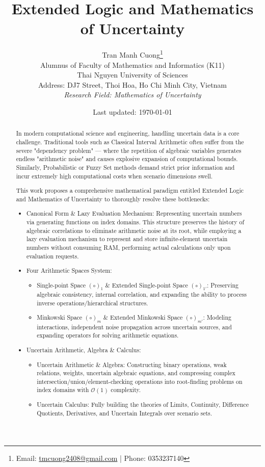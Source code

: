 \documentclass[a4paper,12pt,twoside]{memoir}
\title{Extended Logic and Mathematics of Uncertainty}
\author{
	Tran Manh Cuong\thanks{Email: \href{mailto:tmcuong2408@gmail.com}{tmcuong2408@gmail.com} | Phone: 0353237140} \\[0.5em]
	\small Alumnus of Faculty of Mathematics and Informatics (K11)
	\\ Thai Nguyen University of Sciences \\
	\small Address: DJ7 Street, Thoi Hoa, Ho Chi Minh City, Vietnam \\
	\small \textit{Research Field: Mathematics of Uncertainty}
}
\date{Last updated: \today}
\begin{document}
	
	\maketitle
	
	\begin{abstract}
		In modern computational science and engineering, handling uncertain data is a core challenge. Traditional tools such as Classical Interval Arithmetic often suffer from the severe "dependency problem" --- where the repetition of algebraic variables generates endless "arithmetic noise" and causes explosive expansion of computational bounds. Similarly, Probabilistic or Fuzzy Set methods demand strict prior information and incur extremely high computational costs when scenario dimensions swell.
		
		This work proposes a comprehensive mathematical paradigm entitled Extended Logic and Mathematics of Uncertainty to thoroughly resolve these bottlenecks:
		\begin{itemize}[leftmargin=*]
			\item Canonical Form \& Lazy Evaluation Mechanism: Representing uncertain numbers via generating functions on index domains. This structure preserves the history of algebraic correlations to eliminate arithmetic noise at its root, while employing a lazy evaluation mechanism to represent and store infinite-element uncertain numbers without consuming RAM, performing actual calculations only upon evaluation requests.
			
			\item Four Arithmetic Spaces System:
			\begin{itemize}[leftmargin=*]
				\item Single-point Space $(\circ)_1$ \& Extended Single-point Space $(\circ)_{1'}$: Preserving algebraic consistency, internal correlation, and expanding the ability to process inverse operations/hierarchical structures.
				\item Minkowski Space $(\circ)_m$ \& Extended Minkowski Space $(\circ)_{m'}$: Modeling interactions, independent noise propagation across uncertain sources, and expanding operators for solving arithmetic equations.
			\end{itemize}
			
			\item Uncertain Arithmetic, Algebra \& Calculus:
			\begin{itemize}[leftmargin=*]
				\item Uncertain Arithmetic \& Algebra: Constructing binary operations, weak relations, weights, uncertain algebraic equations, and compressing complex intersection/union/element-checking operations into root-finding problems on index domains with $\mathcal{O}(1)$ complexity.
				\item Uncertain Calculus: Fully building the theories of Limits, Continuity, Difference Quotients, Derivatives, and Uncertain Integrals over scenario sets.
			\end{itemize}
		\end{itemize}
		

\end{abstract}
\end{document}
